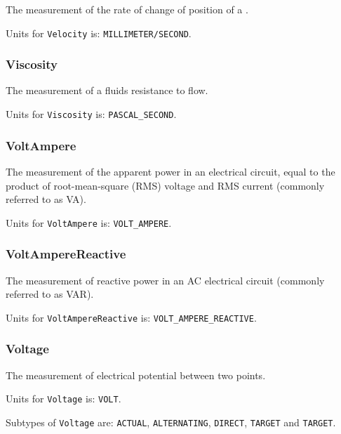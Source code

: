 The measurement of the rate of change of position of a .


Units for \texttt{Velocity} is: \texttt{MILLIMETER/SECOND}.

\FloatBarrier

\subsubsection{Viscosity}
\label{sec:Viscosity}



The measurement of a fluids resistance to flow.


Units for \texttt{Viscosity} is: \texttt{PASCAL_SECOND}.

\FloatBarrier

\subsubsection{VoltAmpere}
\label{sec:VoltAmpere}



The measurement of the apparent power in an electrical circuit, equal to the product of root-mean-square (RMS) voltage and RMS current (commonly referred to as VA).


Units for \texttt{VoltAmpere} is: \texttt{VOLT_AMPERE}.

\FloatBarrier

\subsubsection{VoltAmpereReactive}
\label{sec:VoltAmpereReactive}



The measurement of reactive power in an AC electrical circuit (commonly referred to as VAR).


Units for \texttt{VoltAmpereReactive} is: \texttt{VOLT_AMPERE_REACTIVE}.

\FloatBarrier

\subsubsection{Voltage}
\label{sec:Voltage}



The measurement of electrical potential between two points.


Units for \texttt{Voltage} is: \texttt{VOLT}.


Subtypes of \texttt{Voltage} are: \texttt{ACTUAL}, \texttt{ALTERNATING}, \texttt{DIRECT}, \texttt{TARGET} and \texttt{TARGET}. 
\FloatBarrier

